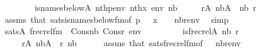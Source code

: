 \begin{isabellebody}
\ \ \ \ \ \ \ \ is{\isacharunderscore}{\kern0pt}names{\isacharunderscore}{\kern0pt}below{\isacharparenleft}{\kern0pt}{\isacharhash}{\kern0pt}{\isacharhash}{\kern0pt}A{\isacharcomma}{\kern0pt}\ nth{\isacharparenleft}{\kern0pt}p{\isacharcomma}{\kern0pt}env{\isacharparenright}{\kern0pt}{\isacharcomma}{\kern0pt}\ nth{\isacharparenleft}{\kern0pt}x{\isacharcomma}{\kern0pt}\ env{\isacharparenright}{\kern0pt}{\isacharcomma}{\kern0pt}\ nb{\isacharparenright}{\kern0pt}{\isachardoublequoteclose}\isanewline
\ \ \ \ \ {\isachardoublequoteopen}r{\isasymin}A{\isachardoublequoteclose}\ {\isachardoublequoteopen}nb{\isasymin}A{\isachardoublequoteclose}\ \ nb\ r\isanewline
\ \ \ \ \isamarkupfalse%
\ assms\ that\ sats{\isacharunderscore}{\kern0pt}is{\isacharunderscore}{\kern0pt}names{\isacharunderscore}{\kern0pt}below{\isacharunderscore}{\kern0pt}fm{\isacharbrackleft}{\kern0pt}of\ {\isachardoublequoteopen}p\ {\isacharhash}{\kern0pt}{\isacharplus}{\kern0pt}\ {}{\isachardoublequoteclose}\ {\isachardoublequoteopen}x\ {\isacharhash}{\kern0pt}{\isacharplus}{\kern0pt}\ {}{\isachardoublequoteclose}\ {}\ {\isachardoublequoteopen}{\isacharbrackleft}{\kern0pt}nb{\isacharcomma}{\kern0pt}r{\isacharbrackright}{\kern0pt}{\isacharat}{\kern0pt}env{\isachardoublequoteclose}{\isacharbrackright}{\kern0pt}\ \isamarkupfalse%
\ simp\isanewline
\ \ \isamarkupfalse%
\isanewline
\ \ \isamarkupfalse%
\ {\isachardoublequoteopen}sats{\isacharparenleft}{\kern0pt}A{\isacharcomma}{\kern0pt}\ frecrel{\isacharunderscore}{\kern0pt}fm{\isacharparenleft}{\kern0pt}{}{\isacharcomma}{\kern0pt}\ {}{\isacharparenright}{\kern0pt}{\isacharcomma}{\kern0pt}\ Cons{\isacharparenleft}{\kern0pt}nb{\isacharcomma}{\kern0pt}\ Cons{\isacharparenleft}{\kern0pt}r{\isacharcomma}{\kern0pt}\ env{\isacharparenright}{\kern0pt}{\isacharparenright}{\kern0pt}{\isacharparenright}{\kern0pt}\ {\isasymlongleftrightarrow}\isanewline
\ \ \ \ \ \ \ \ is{\isacharunderscore}{\kern0pt}frecrel{\isacharparenleft}{\kern0pt}{\isacharhash}{\kern0pt}{\isacharhash}{\kern0pt}A{\isacharcomma}{\kern0pt}\ nb{\isacharcomma}{\kern0pt}\ r{\isacharparenright}{\kern0pt}{\isachardoublequoteclose}\isanewline
\ \ \ \ \ {\isachardoublequoteopen}r{\isasymin}A{\isachardoublequoteclose}\ {\isachardoublequoteopen}nb{\isasymin}A{\isachardoublequoteclose}\ \ r\ nb\isanewline
\ \ \ \ \isamarkupfalse%
\ assms\ that\ sats{\isacharunderscore}{\kern0pt}frecrel{\isacharunderscore}{\kern0pt}fm{\isacharbrackleft}{\kern0pt}of\ {}\ {}\ {\isachardoublequoteopen}{\isacharbrackleft}{\kern0pt}nb{\isacharcomma}{\kern0pt}r{\isacharbrackright}{\kern0pt}{\isacharat}{\kern0pt}env{\isachardoublequoteclose}{\isacharbrackright}{\kern0pt}\ \isamarkupfalse%

\end{isabellebody}
